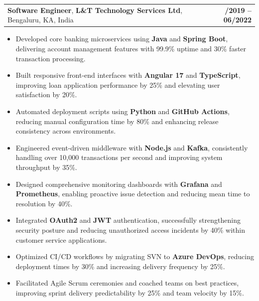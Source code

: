 \documentclass[letterpaper,11pt]{article}
\makeatletter
\newcommand{\resumeItem}[1]{
  \item\footnotesize{
    {#1 \vspace{-2pt}}
  }
}
\newcommand{\resumeSubheading}[4]{
  \vspace{-2pt}\item
    \begin{tabular*}{1.0\textwidth}[t]{l@{\extracolsep{\fill}}r}
      \textbf{\fontsize{10pt}{14pt}\selectfont #3}, \textbf{\fontsize{10pt}{14pt}\selectfont #1}, \fontsize{10pt}{14pt}\selectfont #4 & \textbf{\fontsize{10pt}{14pt}\selectfont #2} \\
    \end{tabular*}\vspace{-7pt}
}
\newcommand{\resumeItemListStart}{\begin{itemize}[leftmargin=*]}
\newcommand{\resumeItemListEnd}{\end{itemize}\vspace{-5pt}}
\makeatother
\begin{document}
    \resumeSubheading
        {L\&T Technology Services Ltd}{08/2019 -- 06/2022}
        {Software Engineer}{Bengaluru, KA, India}
      \resumeItemListStart
        \resumeItem{Developed core banking microservices using \textbf{Java} and \textbf{Spring Boot}, delivering account management features with 99.9\% uptime and 30\% faster transaction processing.}
        \resumeItem{Built responsive front-end interfaces with \textbf{Angular 17} and \textbf{TypeScript}, improving loan application performance by 25\% and elevating user satisfaction by 20\%.}
        \resumeItem{Automated deployment scripts using \textbf{Python} and \textbf{GitHub Actions}, reducing manual configuration time by 80\% and enhancing release consistency across environments.}
        \resumeItem{Engineered event-driven middleware with \textbf{Node.js} and \textbf{Kafka}, consistently handling over 10,000 transactions per second and improving system throughput by 35\%.}
        \resumeItem{Designed comprehensive monitoring dashboards with \textbf{Grafana} and \textbf{Prometheus}, enabling proactive issue detection and reducing mean time to resolution by 40\%.}
        \resumeItem{Integrated \textbf{OAuth2} and \textbf{JWT} authentication, successfully strengthening security posture and reducing unauthorized access incidents by 40\% within customer service applications.}
        \resumeItem{Optimized CI/CD workflows by migrating SVN to \textbf{Azure DevOps}, reducing deployment times by 30\% and increasing delivery frequency by 25\%.}
        \resumeItem{Facilitated Agile Scrum ceremonies and coached teams on best practices, improving sprint delivery predictability by 25\% and team velocity by 15\%.}
      \resumeItemListEnd
\end{document}
